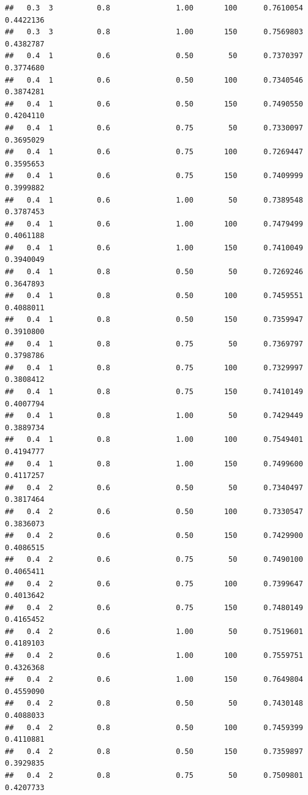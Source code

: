 \documentclass[
  spanish,
]{book}
\theoremstyle{break}
\theoremstyle{definition}
\theoremstyle{definition}
\theoremstyle{definition}
\theoremstyle{remark}
\begin{document}
\begin{verbatim}
##   0.3  3          0.8               1.00       100      0.7610054  0.4422136
##   0.3  3          0.8               1.00       150      0.7569803  0.4382787
##   0.4  1          0.6               0.50        50      0.7370397  0.3774680
##   0.4  1          0.6               0.50       100      0.7340546  0.3874281
##   0.4  1          0.6               0.50       150      0.7490550  0.4204110
##   0.4  1          0.6               0.75        50      0.7330097  0.3695029
##   0.4  1          0.6               0.75       100      0.7269447  0.3595653
##   0.4  1          0.6               0.75       150      0.7409999  0.3999882
##   0.4  1          0.6               1.00        50      0.7389548  0.3787453
##   0.4  1          0.6               1.00       100      0.7479499  0.4061188
##   0.4  1          0.6               1.00       150      0.7410049  0.3940049
##   0.4  1          0.8               0.50        50      0.7269246  0.3647893
##   0.4  1          0.8               0.50       100      0.7459551  0.4088011
##   0.4  1          0.8               0.50       150      0.7359947  0.3910800
##   0.4  1          0.8               0.75        50      0.7369797  0.3798786
##   0.4  1          0.8               0.75       100      0.7329997  0.3808412
##   0.4  1          0.8               0.75       150      0.7410149  0.4007794
##   0.4  1          0.8               1.00        50      0.7429449  0.3889734
##   0.4  1          0.8               1.00       100      0.7549401  0.4194777
##   0.4  1          0.8               1.00       150      0.7499600  0.4117257
##   0.4  2          0.6               0.50        50      0.7340497  0.3817464
##   0.4  2          0.6               0.50       100      0.7330547  0.3836073
##   0.4  2          0.6               0.50       150      0.7429900  0.4086515
##   0.4  2          0.6               0.75        50      0.7490100  0.4065411
##   0.4  2          0.6               0.75       100      0.7399647  0.4013642
##   0.4  2          0.6               0.75       150      0.7480149  0.4165452
##   0.4  2          0.6               1.00        50      0.7519601  0.4189103
##   0.4  2          0.6               1.00       100      0.7559751  0.4326368
##   0.4  2          0.6               1.00       150      0.7649804  0.4559090
##   0.4  2          0.8               0.50        50      0.7430148  0.4088033
##   0.4  2          0.8               0.50       100      0.7459399  0.4110881
##   0.4  2          0.8               0.50       150      0.7359897  0.3929835
##   0.4  2          0.8               0.75        50      0.7509801  0.4207733

\end{verbatim}
\end{document}
